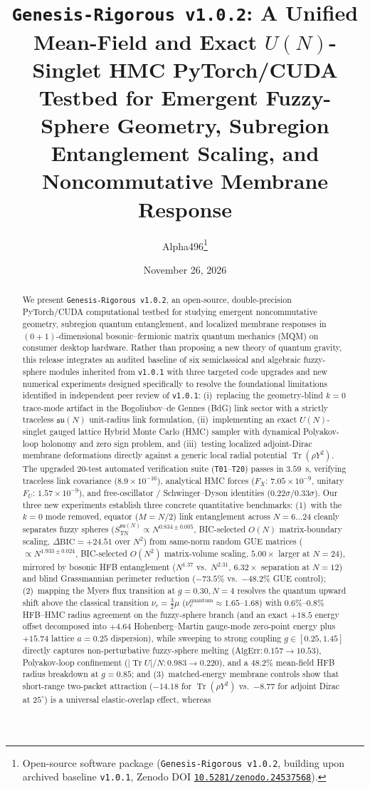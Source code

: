 \documentclass[11pt,a4paper]{article}
\title{\textbf{\texttt{Genesis-Rigorous v1.0.2}: A Unified Mean-Field and Exact $U(N)$-Singlet HMC PyTorch/CUDA Testbed for Emergent Fuzzy-Sphere Geometry, Subregion Entanglement Scaling, and Noncommutative Membrane Response}}
\author{Alpha496\thanks{Open-source software package (\texttt{Genesis-Rigorous v1.0.2}, building upon archived baseline \texttt{v1.0.1}, Zenodo DOI \href{https://doi.org/10.5281/zenodo.24537568}{\texttt{10.5281/zenodo.24537568}}).}}
\date{November 26, 2026}
\DeclareMathOperator{\Tr}{Tr}
\begin{document}
\maketitle

\begin{abstract}
We present \texttt{Genesis-Rigorous v1.0.2}, an open-source, double-precision PyTorch/CUDA computational testbed for studying emergent noncommutative geometry, subregion quantum entanglement, and localized membrane responses in $(0+1)$-dimensional bosonic--fermionic matrix quantum mechanics (MQM) on consumer desktop hardware. Rather than proposing a new theory of quantum gravity, this release integrates an audited baseline of six semiclassical and algebraic fuzzy-sphere modules inherited from \texttt{v1.0.1} with three targeted code upgrades and new numerical experiments designed specifically to resolve the foundational limitations identified in independent peer review of \texttt{v1.0.1}: (i)~replacing the geometry-blind $k=0$ trace-mode artifact in the Bogoliubov--de Gennes (BdG) link sector with a strictly traceless $\mathfrak{su}(N)$ unit-radius link formulation, (ii)~implementing an exact $U(N)$-singlet gauged lattice Hybrid Monte Carlo (HMC) sampler with dynamical Polyakov-loop holonomy and zero sign problem, and (iii)~testing localized adjoint-Dirac membrane deformations directly against a generic local radial potential $\Tr(\rho Y^2)$. The upgraded 20-test automated verification suite (\texttt{T01}--\texttt{T20}) passes in $3.59$~s, verifying traceless link covariance ($8.9\times 10^{-16}$), analytical HMC forces ($F_X$: $7.05\times 10^{-9}$, unitary $F_U$: $1.57\times 10^{-9}$), and free-oscillator / Schwinger--Dyson identities ($0.22\sigma / 0.33\sigma$). Our three new experiments establish three concrete quantitative benchmarks: (1)~with the $k=0$ mode removed, equator ($M=N/2$) link entanglement across $N=6\dots 24$ cleanly separates fuzzy spheres ($S_{\mathrm{TN}}^{\mathfrak{su}(N)} \propto N^{0.834\pm 0.005}$, BIC-selected $O(N)$ matrix-boundary scaling, $\Delta\mathrm{BIC}=+24.51$ over $N^2$) from same-norm random GUE matrices ($\propto N^{1.933\pm 0.024}$, BIC-selected $O(N^2)$ matrix-volume scaling, $5.00\times$ larger at $N=24$), mirrored by bosonic HFB entanglement ($N^{1.37}$ vs.\ $N^{2.31}$, $6.32\times$ separation at $N=12$) and blind Grassmannian perimeter reduction ($-73.5\%$ vs.\ $-48.2\%$ GUE control); (2)~mapping the Myers flux transition at $g=0.30, N=4$ resolves the quantum upward shift above the classical transition $\nu_c = \frac{3}{2}\mu$ ($\nu_c^{\mathrm{quantum}} \approx 1.65$--$1.68$) with $0.6\%$--$0.8\%$ HFB--HMC radius agreement on the fuzzy-sphere branch (and an exact $+18.5$ energy offset decomposed into $+4.64$ Hohenberg--Martin gauge-mode zero-point energy plus $+15.74$ lattice $a=0.25$ dispersion), while sweeping to strong coupling $g \in [0.25, 1.45]$ directly captures non-perturbative fuzzy-sphere melting ($\mathrm{AlgErr}: 0.157 \to 10.53$), Polyakov-loop confinement ($|\Tr U|/N: 0.983 \to 0.220$), and a $48.2\%$ mean-field HFB radius breakdown at $g=0.85$; and (3)~matched-energy membrane controls show that short-range two-packet attraction ($-14.18$ for $\Tr(\rho Y^2)$ vs.\ $-8.77$ for adjoint Dirac at $25^\circ$) is a universal elastic-overlap effect, whereas 
\end{abstract}
\end{document}
